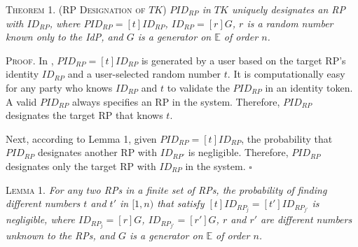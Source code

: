 \vspace{3mm}
\noindent\textsc{Theorem 1. (RP Designation of $TK$)} {\em $PID_{RP}$ in $TK$ uniquely designates an RP with $ID_{RP}$, where $PID_{RP}= [t]ID_{RP}$, $ID_{RP} = [r]G$, $r$ is a random number known only to the IdP, and $G$ is a generator on $\mathbb{E}$ of order $n$.}

\vspace{0.75mm}
\noindent\textsc{Proof.} In \usso, $PID_{RP}=[t]ID_{RP}$ is generated by a user based on the target RP's identity $ID_{RP}$ and a user-selected random number $t$.
It is computationally easy for any party who knows $ID_{RP}$ and $t$ to validate the $PID_{RP}$ in an identity token. A valid $PID_{RP}$ always specifies an RP in the system. %
Therefore, $PID_{RP}$ designates the target RP that knows $t$.

Next, according to Lemma 1, given $PID_{RP} = [t]ID_{RP}$, the probability that $PID_{RP}$ designates another RP with $ID_{RP'}$ is negligible. %
Therefore, $PID_{RP}$ designates only the target RP with $ID_{RP}$ in the system.  \hfill $\square$

\vspace{3mm}
\noindent\textsc{Lemma 1.} {\em  For any two RPs in a finite set of RPs, the probability of finding different numbers $t$ and $t'$ in $[1,n)$ that satisfy $[t]ID_{RP_j} = [t']ID_{RP_{j'}}$ is negligible, where $ID_{RP_j}=[r]G$, $ID_{RP_{j'}}=[r']G$, $r$ and $r'$ are different numbers unknown to the RPs, and $G$ is a generator on $\mathbb{E}$ of order $n$.}


